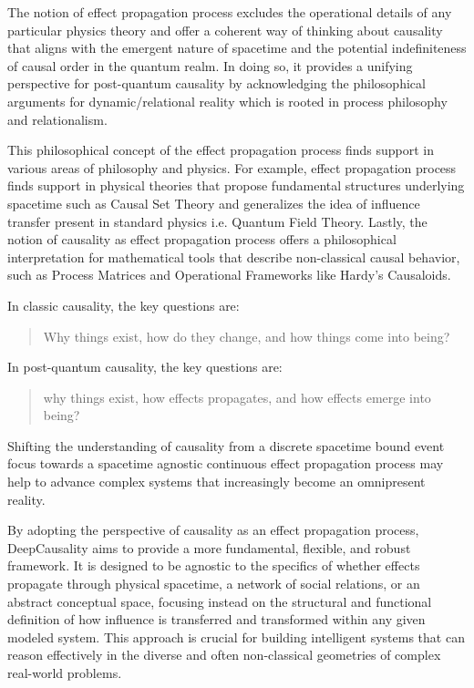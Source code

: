 The notion of effect propagation process excludes the operational details of any particular physics theory and offer a coherent way of thinking about causality that aligns with the emergent nature of spacetime and the potential indefiniteness of causal order in the quantum realm. In doing so, it provides a unifying perspective for post-quantum causality by acknowledging the philosophical arguments for dynamic/relational reality which is rooted in process philosophy and relationalism.

This philosophical concept of the effect propagation process finds support in various areas of philosophy and physics. For example, effect propagation process finds support in physical theories that propose fundamental structures underlying spacetime such as Causal Set Theory and generalizes the idea of influence transfer present in standard physics i.e. Quantum Field Theory. Lastly, the notion of causality as effect propagation process offers a philosophical interpretation for mathematical tools that describe non-classical causal behavior, such as Process Matrices and Operational Frameworks like Hardy’s Causaloids.

In classic causality, the key questions are: 

\begin{quote}
    Why things exist, how do they change, and how things come into being?
\end{quote}

In post-quantum causality, the key questions are:

\begin{quote}
     why things exist, how effects propagates, and how effects emerge into being?
\end{quote}

Shifting the understanding of causality from a discrete spacetime bound event focus towards a spacetime agnostic continuous effect propagation process may help to advance complex systems that increasingly become an omnipresent reality. 

By adopting the perspective of causality as an effect propagation process, DeepCausality aims to provide a more fundamental, flexible, and robust framework. It is designed to be agnostic to the specifics of whether effects propagate through physical spacetime, a network of social relations, or an abstract conceptual space, focusing instead on the structural and functional definition of how influence is transferred and transformed within any given modeled system. This approach is crucial for building intelligent systems that can reason effectively in the diverse and often non-classical geometries of complex real-world problems.
